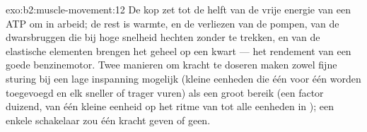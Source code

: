 \begin{solution}{exo:b2:muscle-movement:12}
De kop zet tot de helft van de vrije energie van een ATP om in arbeid; de
rest is warmte, en de verliezen van de pompen, van de dwarsbruggen die bij
hoge snelheid hechten zonder te trekken, en van de elastische elementen
brengen het geheel op een kwart --- het rendement van een goede benzinemotor.
Twee manieren om kracht te doseren maken zowel fijne sturing bij een lage
inspanning mogelijk (kleine eenheden die één voor één worden toegevoegd en
elk sneller of trager vuren) als een groot bereik (een factor duizend, van één
kleine eenheid op het ritme van  tot alle eenheden in
); een enkele schakelaar zou één kracht geven of geen.
\end{solution}

